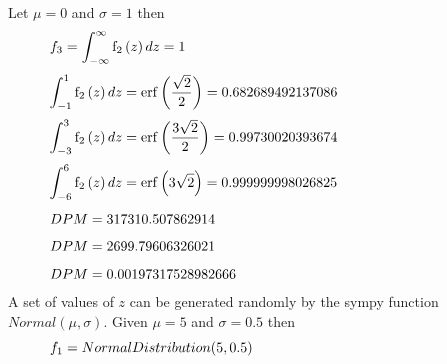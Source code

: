 \documentclass[10pt,a4paper]{article}
\begin{document}
\noindent Let $\mu = 0 $ and $\sigma = 1 $ then 
\begin{equation}
\begin{minipage}{300pt}
 $\displaystyle f_{3} = \int_{-\infty}^{\infty} \operatorname{f_{2}}{\left (z \right )}\, dz = 1$  
\end{minipage}
\end{equation}
\begin{equation}
\begin{minipage}{300pt}
 $\displaystyle \int_{-1}^{1} \operatorname{f_{2}}{\left (z \right )}\, dz = \operatorname{erf}{\left (\frac{\sqrt{2}}{2} \right )} = 0.682689492137086$  
\end{minipage}
\end{equation}
\begin{equation}
\begin{minipage}{300pt}
 $\displaystyle \int_{-3}^{3} \operatorname{f_{2}}{\left (z \right )}\, dz = \operatorname{erf}{\left (\frac{3 \sqrt{2}}{2} \right )} = 0.99730020393674$  
\end{minipage}
\end{equation}
\begin{equation}
\begin{minipage}{300pt}
 $\displaystyle \int_{-6}^{6} \operatorname{f_{2}}{\left (z \right )}\, dz = \operatorname{erf}{\left (3 \sqrt{2} \right )} = 0.999999998026825$  
\end{minipage}
\end{equation}
\begin{equation}
\begin{minipage}{300pt}
 $\displaystyle DPM = 317310.507862914$  
\end{minipage}
\end{equation}
\begin{equation}
\begin{minipage}{300pt}
 $\displaystyle DPM = 2699.79606326021$  
\end{minipage}
\end{equation}
\begin{equation}
\begin{minipage}{300pt}
 $\displaystyle DPM = 0.00197317528982666$  
\end{minipage}
\end{equation}
\noindent A set of values of $z$ can be generated randomly by the sympy function \\     $Normal(\mu, \sigma)$. Given  $\mu = 5 $ and $\sigma = 0.5 $ then 
\begin{equation}
\begin{minipage}{300pt}
 $\displaystyle f_{1} = NormalDistribution(5, 0.5)$  
\end{minipage}
\end{equation}
\end{document}
